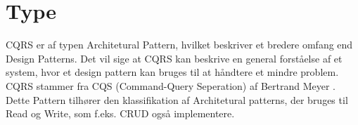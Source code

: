 \section{Type}

CQRS er af typen Architetural Pattern, hvilket beskriver et bredere omfang end Design Patterns. Det vil sige at CQRS kan beskrive en general forståelse af et system, hvor et design pattern kan bruges til at håndtere et mindre problem. CQRS stammer fra CQS (Command-Query Seperation) af Bertrand Meyer \cite{wikipedia-CQS}. 
Dette Pattern tilhører den klassifikation af Architetural patterns, der bruges til Read og Write, som f.eks. CRUD også implementere.

